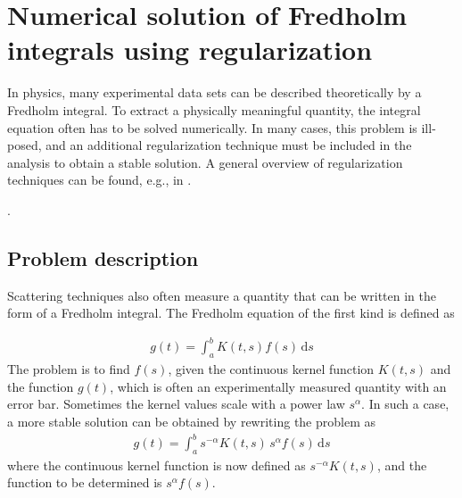\chapter{Numerical solution of Fredholm integrals using regularization}
In physics, many experimental data sets can be described theoretically by a Fredholm integral. To extract a physically meaningful quantity, the integral equation often has to be solved numerically. In many cases, this problem is ill-posed, and an additional regularization technique must be included in the analysis to obtain a stable solution. A general overview of regularization techniques can be found, e.g., in \cite{Hansen1998,Hansen2000b,Gazzola2018,Scherzer2011,Kern2016}.

\nocite{Benvenuto2016,Gao2016,Hansen2016,Pedersen2014,Sen2014,Blanchet2013,Mroczka2013,Paul2013,
Mroczka2013,Liu2012,Zhenhai2012,Bauer2011,Debski2010,Hansen2008,Santos2007,Wang2007,Stribeck2006,Vestergaard2006,Tatchev2004,
Hansen2003,Castellanos2002,Pike2002,Bergmann2000,Hansen2000,Hansen2000a,Elliott1999,Weyerich1999,Mittelbach1998,Mulato1998,
Brunner-Popela1997,Durchschlag1997,Mulato1997,Tsao1997,Gilmore1996,Hansen1996,Kline1996,Krauthauser1996,Muller1996,Mulato1996,
Serimaa1996,Jakes1995,Jemian1994,Ross1994,Steenstrup1994,Svergun1994,Glatter1993,Svergun1993,Morrison1992,Svergun1992,
Glatter1991,Goldin1991,Hansen1991,Semenyuk1991,Svergun1991,Jakes1991,Jakes1990,Bricogne1988,Glatter1988,Magnani1988,Potton1988,Potton1988a,
Svergun1988,Jakes1988,Thomas1987,Xu1987,Luzzati1986,Jakes1986,Livesey1985,Walter1985,Kubota1985,Bricogne1984,Glatter1984,Provencher1984,
Skilling1984,Britten1982,Kratky1982,Provencher1982,Provencher1982a,Taupin1982,Glatter1981,Glatter1980,Glatter1980b,Moore1980,Glatter1979,
Provencher1978,Glatter1977,Vonk1976,Pusey1974,Debye1915,Larsen2018,Bressler2015}.

\section{Problem description}
Scattering techniques also often measure a quantity that can be written in the form of a Fredholm integral.
The Fredholm equation of the first kind is defined as

\begin{align}
\label{eq:Fredholm}
g(t)=\int _{a}^{b}K(t,s)f(s)\,\mathrm {d} s
\end{align}
The problem is to find $f(s)$, given the continuous kernel function $K(t,s)$ and the function $g(t)$, which is often an experimentally measured quantity with an error bar. Sometimes the kernel values scale with a power law $s^\alpha$. In such a case, a more stable solution can be obtained by rewriting the problem as
\begin{align}
\label{eq:KernelScaling}
g(t)=\int _{a}^{b}s^{-\alpha} K(t,s) \, s^{\alpha}f(s)\,\mathrm {d} s
\end{align}
where the continuous kernel function is now defined as $s^{-\alpha}K(t,s)$, and the function to be determined is $s^{\alpha} f(s)$.

